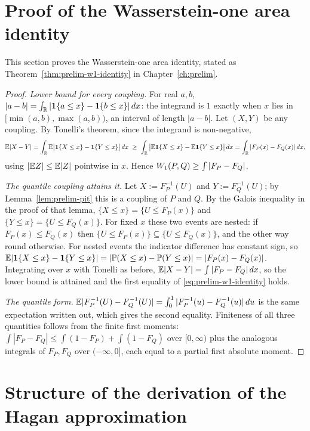 \documentclass[../../main.tex]{subfiles}
\begin{document}
\section{Proof of the Wasserstein-one area identity}\label{appB:w1}

This section proves the Wasserstein-one area identity, stated as Theorem~\ref{thm:prelim-w1-identity} in Chapter~\ref{ch:prelim}.

\begin{proof}
\emph{Lower bound for every coupling.} For real $a,b$, $|a-b|=\int_{\mathbb{R}}|\mathbf{1}\{a\le x\}-\mathbf{1}\{b\le x\}|\,dx$: the integrand is $1$ exactly when $x$ lies in $[\min(a,b),\max(a,b))$, an interval of length $|a-b|$. Let $(X,Y)$ be any coupling. By Tonelli's theorem, since the integrand is non-negative,
\[
\mathbb{E}|X-Y|=\int_{\mathbb{R}}\mathbb{E}\big|\mathbf{1}\{X\le x\}-\mathbf{1}\{Y\le x\}\big|\,dx\;\ge\;\int_{\mathbb{R}}\big|\mathbb{E}\mathbf{1}\{X\le x\}-\mathbb{E}\mathbf{1}\{Y\le x\}\big|\,dx=\int_{\mathbb{R}}|F_P(x)-F_Q(x)|\,dx,
\]
using $|\mathbb{E} Z|\le\mathbb{E}|Z|$ pointwise in $x$. Hence $W_1(P,Q)\ge\int|F_P-F_Q|$.

\emph{The quantile coupling attains it.} Let $X:=F_P^{-1}(U)$ and $Y:=F_Q^{-1}(U)$; by Lemma~\ref{lem:prelim-pit} this is a coupling of $P$ and $Q$. By the Galois inequality in the proof of that lemma, $\{X\le x\}=\{U\le F_P(x)\}$ and $\{Y\le x\}=\{U\le F_Q(x)\}$. For fixed $x$ these two events are nested: if $F_P(x)\le F_Q(x)$ then $\{U\le F_P(x)\}\subseteq\{U\le F_Q(x)\}$, and the other way round otherwise. For nested events the indicator difference has constant sign, so $\mathbb{E}|\mathbf{1}\{X\le x\}-\mathbf{1}\{Y\le x\}|=|\mathbb{P}(X\le x)-\mathbb{P}(Y\le x)|=|F_P(x)-F_Q(x)|$. Integrating over $x$ with Tonelli as before, $\mathbb{E}|X-Y|=\int|F_P-F_Q|\,dx$, so the lower bound is attained and the first equality of \eqref{eq:prelim-w1-identity} holds.

\emph{The quantile form.} $\mathbb{E}|F_P^{-1}(U)-F_Q^{-1}(U)|=\int_0^1|F_P^{-1}(u)-F_Q^{-1}(u)|\,du$ is the same expectation written out, which gives the second equality. Finiteness of all three quantities follows from the finite first moments: $\int|F_P-F_Q|\le\int(1-F_P)+\int(1-F_Q)$ over $[0,\infty)$ plus the analogous integrals of $F_P,F_Q$ over $(-\infty,0]$, each equal to a partial first absolute moment.
\end{proof}

\section{Structure of the derivation of the Hagan approximation}\label{appB:hagan}
\end{document}
